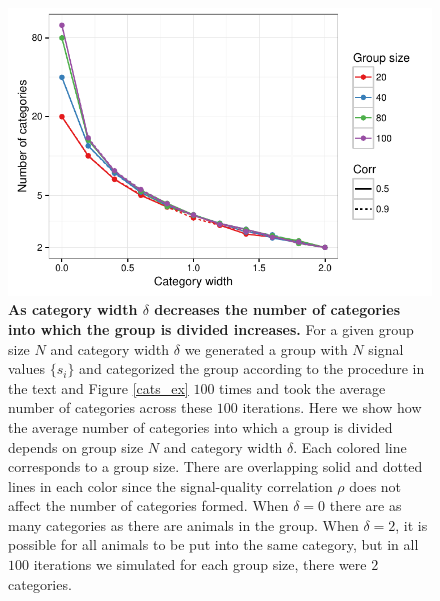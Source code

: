 \begin{figure}[ht]
\includegraphics[width=.8\textwidth]{figures/number_of_categories.pdf}
\caption{\sffamily\small\textbf{As category width $\delta$ decreases the number of categories into which the group is divided increases.}
For a given group size $N$ and category width $\delta$ we generated a group with $N$ signal values $\{s_i\}$ and categorized the group according to the procedure in the text and Figure \ref{cats_ex} $100$ times and took the average number of categories across these $100$ iterations. Here we show how the average number of categories into which a group is divided depends on group size $N$ and category width $\delta$.  Each colored line corresponds to a group size. There are overlapping solid and dotted lines in each color since the signal-quality correlation $\rho$ does not affect the number of categories formed. When $\delta=0$ there are as many categories as there are animals in the group. When $\delta=2$, it is possible for all animals to be put into the same category, but in all $100$ iterations we simulated for each group size, there were $2$ categories. }
\label{num_cat}
\end{figure}

